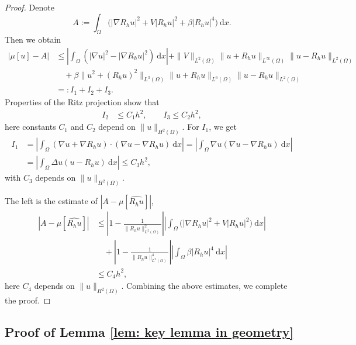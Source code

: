 \documentclass{siamart250211}
\begin{document}
\begin{proof}
	Denote 
\begin{equation*}
	A:= \int_{\Omega} \Big( |\nabla R_hu|^2 + V |R_h u|^2 + \beta |R_hu|^4 \Big)\ \text{d}x.
\end{equation*}
Then we obtain
\begin{align*}
		|\mu[u] - A | & \le \left| \int_{\Omega}  (|\nabla u|^2 - |\nabla R_hu|^2)\  \text{d} x \right| + \|V\|_{L^{2}(\Omega)}\|u+R_hu\|_{L^{\infty}(\Omega)}\|u-R_hu\|_{L^2(\Omega)} \\
		& \quad + \beta \|u^2 + (R_hu)^2\|_{L^3(\Omega)}\|u+R_hu\|_{L^6(\Omega)}\|u-R_hu\|_{L^2(\Omega)} \\
		& =: I_1 + I_2 + I_3.
	\end{align*}
Properties of the Ritz projection show that
	\begin{align*}
		I_2 & \le C_1 h^2  , \qquad I_3 \le  C_2 h^2,
	\end{align*}
    here constants $C_1$ and $C_2$ depend on $\|u\|_{H^2(\Omega)}$.
	For $I_1$, we get
\begin{align*}
		I_1 & = \left| \int_{\Omega} (\nabla u + \nabla R_hu)\cdot(\nabla u - \nabla R_hu) \ \text{d} x \right| = \left| \int_{\Omega}   \nabla u (\nabla u - \nabla R_hu) \  \text{d} x \right| \\
		& = \left|\int_{\Omega} \Delta u (u -  R_hu) \ \text{d} x\right| \le C_3h^2,
	\end{align*}
    with $C_3$ depends on $\|u\|_{H^2(\Omega)}$.
    
	The left is the estimate of $\left|A - \mu[\widehat{R_hu}]\right|$, 
	\begin{align*}
		\left|A - \mu[\widehat{R_hu}]\right| & \le \left| 1 - \frac{1}{\|R_hu\|_{L^2(\Omega)}^2} \right|\left| \int_{\Omega} \Big(  |\nabla R_hu|^2 + V |R_hu|^2 \Big) \ \text{d} x\right| \\
		& \quad  + \left| 1 - \frac{1}{\|R_hu\|_{L^2(\Omega)}^4} \right| \left| \int_{\Omega} \beta |R_hu|^4 \ \text{d} x\right| \\
		& \le C_4h^2,
	\end{align*}
	here $C_4$ depends on $\|u\|_{H^2(\Omega)}$. Combining the above estimates, we complete the proof.
\end{proof}

\subsection{Proof of Lemma \ref{lem: key lemma in geometry}}
\end{document}
